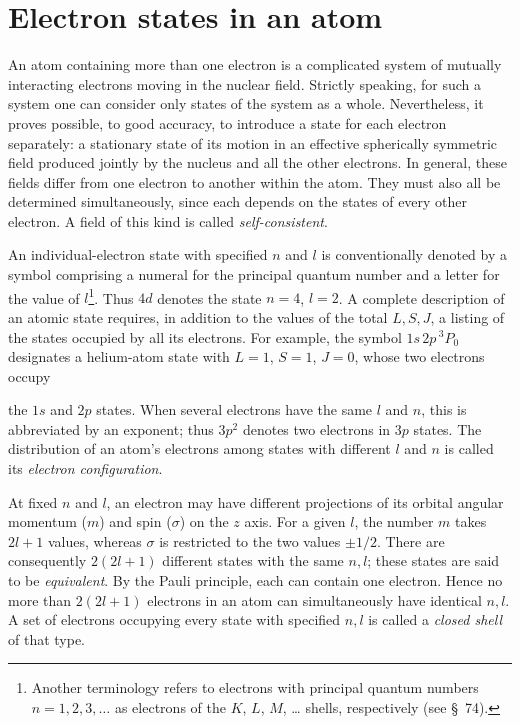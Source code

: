 \section{Electron states in an atom}

An atom containing more than one electron is a complicated system of mutually
interacting electrons moving in the nuclear field. Strictly speaking, for such
a system one can consider only states of the system as a whole. Nevertheless,
it proves possible, to good accuracy, to introduce a state for each electron
separately: a stationary state of its motion in an effective spherically
symmetric field produced jointly by the nucleus and all the other electrons.
In general, these fields differ from one electron to another within the atom.
They must also all be determined simultaneously, since each depends on the
states of every other electron. A field of this kind is called
\emph{self-consistent}.



An individual-electron state with specified $n$ and $l$ is conventionally
denoted by a symbol comprising a numeral for the principal quantum number and
a letter for the value of $l$\footnote{Another terminology refers to electrons
with principal quantum numbers $n=1,2,3,\ldots$ as electrons of the $K$,
$L$, $M$, \ldots{} shells, respectively (see \S~74).}. Thus $4d$ denotes the
state $n=4$, $l=2$. A complete description of an atomic state requires, in
addition to the values of the total $L,S,J$, a listing of the states occupied
by all its electrons. For example, the symbol $1s\,2p\,{}^3P_0$ designates a
helium-atom state with $L=1$, $S=1$, $J=0$, whose two electrons occupy

the $1s$ and $2p$ states. When several electrons have the same $l$ and $n$,
this is abbreviated by an exponent; thus $3p^2$ denotes two electrons in
$3p$ states. The distribution of an atom's electrons among states with
different $l$ and $n$ is called its \emph{electron configuration}.

At fixed $n$ and $l$, an electron may have different projections of its
orbital angular momentum ($m$) and spin ($\sigma$) on the $z$ axis. For a
given $l$, the number $m$ takes $2l+1$ values, whereas $\sigma$ is restricted
to the two values $\pm1/2$. There are consequently $2(2l+1)$ different states
with the same $n,l$; these states are said to be \emph{equivalent}. By the
Pauli principle, each can contain one electron. Hence no more than $2(2l+1)$
electrons in an atom can simultaneously have identical $n,l$. A set of
electrons occupying every state with specified $n,l$ is called a
\emph{closed shell} of that type.

